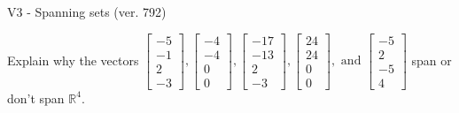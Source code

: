 \begin{exercise}
  \begin{exerciseTitle}V3 - Spanning sets (ver. 792)\end{exerciseTitle}
  \begin{exerciseStatement}
    Explain why the vectors \(\left[\begin{array}{r}
-5 \\
-1 \\
2 \\
-3
\end{array}\right] , \left[\begin{array}{r}
-4 \\
-4 \\
0 \\
0
\end{array}\right] , \left[\begin{array}{r}
-17 \\
-13 \\
2 \\
-3
\end{array}\right] , \left[\begin{array}{r}
24 \\
24 \\
0 \\
0
\end{array}\right] , \text{ and } \left[\begin{array}{r}
-5 \\
2 \\
-5 \\
4
\end{array}\right]\) span or don't span \(\mathbb{R}^4\). 
	



\end{exerciseStatement}
\end{exercise}
